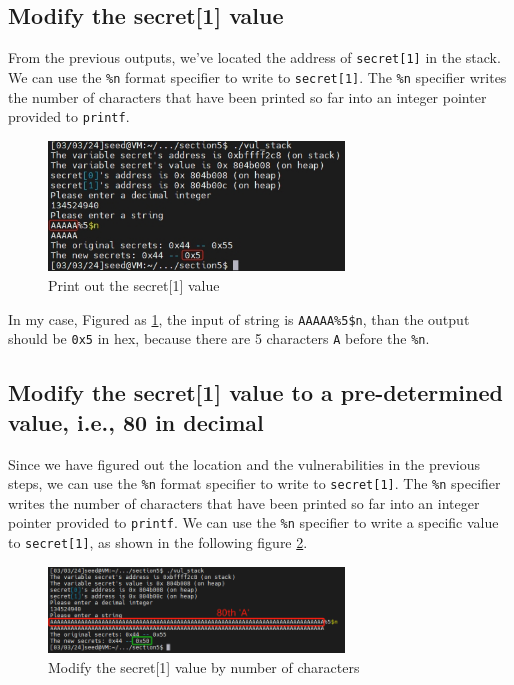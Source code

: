 \documentclass[a4paper,11pt]{article}
\begin{document}
\subsection{Modify the secret[1] value}
From the previous outputs, we've located the address of \verb|secret[1]| in the stack. We can use the \verb|%n| format specifier to write to \verb|secret[1]|. The \verb|%n| specifier writes the number of characters that have been printed so far into an integer pointer provided to \verb|printf|.
\begin{figure}[h]
    \centering
       \includegraphics[width=0.7\textwidth]{figures/task24/task24.png}
    \caption{Print out the secret[1] value}\label{fig:task24}
\end{figure}

In my case, Figured as \ref{fig:task24}, the input of string is \verb|AAAAA%5$n|, than the output should be \verb|0x5| in hex, because there are 5 characters \verb|A| before the \verb|%n|.

\subsection{Modify the secret[1] value to a pre-determined value, i.e., 80 in decimal}
Since we have figured out the location and the vulnerabilities in the previous steps, we can use the \verb|%n| format specifier to write to \verb|secret[1]|. The \verb|%n| specifier writes the number of characters that have been printed so far into an integer pointer provided to \verb|printf|. We can use the \verb|%n| specifier to write a specific value to \verb|secret[1]|, as shown in the following figure \ref{fig:task25}.
\begin{figure}[h]
    \centering
       \includegraphics[width=0.7\textwidth]{figures/task25/task25.png}
    \caption{Modify the secret[1] value by number of characters}\label{fig:task25}
\end{figure}
\end{document}
